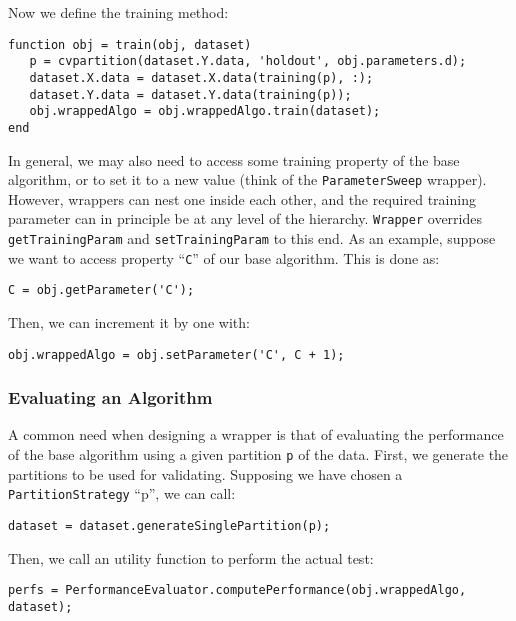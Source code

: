 \noindent Now we define the training method:

\begin{lstlisting}
function obj = train(obj, dataset)
   p = cvpartition(dataset.Y.data, 'holdout', obj.parameters.d);
   dataset.X.data = dataset.X.data(training(p), :);
   dataset.Y.data = dataset.Y.data(training(p));
   obj.wrappedAlgo = obj.wrappedAlgo.train(dataset);
end
\end{lstlisting}

\noindent In general, we may also need to access some training property of the base algorithm, or to set it to a new value (think of the \verb|ParameterSweep| wrapper). However, wrappers can nest one inside each other, and the required training parameter can in principle be at any level of the hierarchy. \verb|Wrapper| overrides \verb|getTrainingParam| and \verb|setTrainingParam| to this end. As an example, suppose we want to access property ``\verb|C|'' of our base algorithm. This is done as:

\begin{lstlisting}
C = obj.getParameter('C');
\end{lstlisting}

\noindent Then, we can increment it by one with:

\begin{lstlisting}
obj.wrappedAlgo = obj.setParameter('C', C + 1);
\end{lstlisting}

\subsubsection{Evaluating an Algorithm}

A common need when designing a wrapper is that of evaluating the performance of the base algorithm using a given partition \verb|p| of the data. First, we generate the partitions to be used for validating. Supposing we have chosen a \verb|PartitionStrategy| ``p'', we can call:

\begin{lstlisting}
dataset = dataset.generateSinglePartition(p);
\end{lstlisting}

\noindent Then, we call an utility function to perform the actual test:

\begin{lstlisting}
perfs = PerformanceEvaluator.computePerformance(obj.wrappedAlgo, dataset);
\end{lstlisting}


